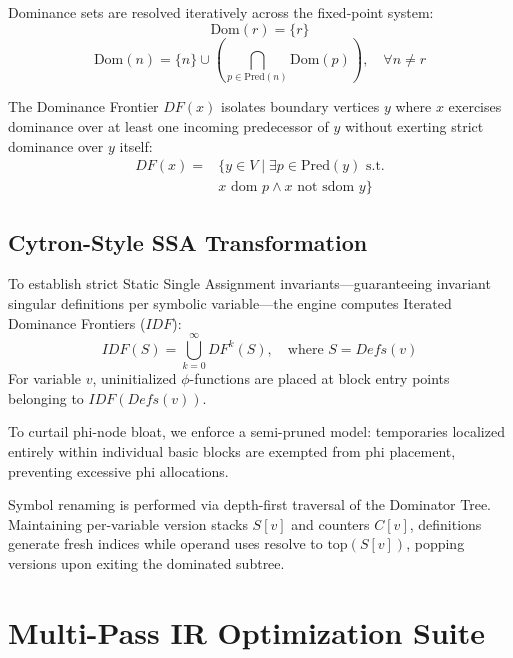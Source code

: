 \documentclass{ieeeaccess}
\begin{document}
Dominance sets are resolved iteratively across the fixed-point system:
\begin{equation}
\text{Dom}(r) = \{r\}
\end{equation}
\begin{equation}
\text{Dom}(n) = \{n\} \cup \left( \bigcap_{p \in \text{Pred}(n)} \text{Dom}(p) \right), \quad \forall n \neq r
\end{equation}

The Dominance Frontier $DF(x)$ isolates boundary vertices $y$ where $x$ exercises dominance over at least one incoming predecessor of $y$ without exerting strict dominance over $y$ itself:
\begin{equation}
\begin{aligned}
DF(x) ={}& \{ y \in V \mid \exists p \in \text{Pred}(y) \text{ s.t.} \\
& x \text{ dom } p \land x \text{ not sdom } y \}
\end{aligned}
\end{equation}

\subsection{Cytron-Style SSA Transformation}
To establish strict Static Single Assignment invariants—guaranteeing invariant singular definitions per symbolic variable—the engine computes Iterated Dominance Frontiers ($IDF$):
\begin{equation}
IDF(S) = \bigcup_{k=0}^{\infty} DF^k(S), \quad \text{where } S = Defs(v)
\end{equation}
For variable $v$, uninitialized $\phi$-functions are placed at block entry points belonging to $IDF(Defs(v))$.

To curtail phi-node bloat, we enforce a semi-pruned model: temporaries localized entirely within individual basic blocks are exempted from phi placement, preventing excessive phi allocations.

Symbol renaming is performed via depth-first traversal of the Dominator Tree. Maintaining per-variable version stacks $S[v]$ and counters $C[v]$, definitions generate fresh indices while operand uses resolve to $\text{top}(S[v])$, popping versions upon exiting the dominated subtree.

\section{Multi-Pass IR Optimization Suite}
\label{sec:optimizer} %
\end{document}
